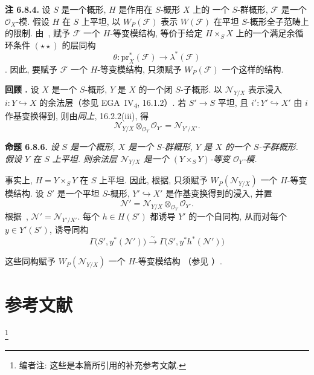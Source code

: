 \medskip
\noindent{}\textbf{注 6.8.4.}
设 \(S\) 是一个概形, \(H\) 是作用在 \(S\)-概形 \(X\) 上的
一个 \(S\)-群概形, \(\mathcal F\) 是一个 \(\mathcal O_X\)-模.
假设 \(H\) 在 \(S\) 上平坦, 以 \(W_P(\mathcal F)\) 表示
\(W(\mathcal F)\) 在平坦 \(S\)-概形全子范畴上的限制.
由~, 赋予
\(\mathcal F\) 一个 \(H\)-等变模结构, 等价于给定
\(H\times_SX\) 上的一个满足余循环条件 \((\star\star)\) 的层同构
\[
  \theta:\mathrm{pr}_X^*(\mathcal F)\longrightarrow\lambda^*(\mathcal F)
\]
. 因此, 要赋予 \(\mathcal F\) 一个 \(H\)-等变模结构,
只须赋予 \(W_P(\mathcal F)\) 一个这样的结构.

\medskip
{}\noindent\textbf{回顾 .}
设 \(X\) 是一个 \(S\)-概形, \(Y\) 是 \(X\) 的一个闭
\(S\)-子概形. 以 \(\mathcal N_{Y/X}\) 表示浸入
\(i:Y\hookrightarrow X\) 的余法层（参见 EGA~IV\textsubscript{4},
16.1.2）. 若 \(S'\to S\) 平坦, 且
\(i':Y'\hookrightarrow X'\) 由 \(i\) 作基变换得到,
则由\emph{同上}, 16.2.2(iii), 得
\[
  \mathcal N_{Y/X}\otimes_{\mathcal O_Y}\mathcal O_{Y'}
  =\mathcal N_{Y'/X'}.
\]

\medskip
\noindent{}\textbf{命题 6.8.6.}
\textit{设 \(S\) 是一个概形, \(X\) 是一个 \(S\)-群概形,
\(Y\) 是 \(X\) 的一个 \(S\)-子群概形. 假设 \(Y\) 在 \(S\)
上平坦. 则余法层 \(\mathcal N_{Y/X}\) 是一个
\((Y\times_SY)\)-等变 \(\mathcal O_Y\)-模.}

事实上, \(H=Y\times_SY\) 在 \(S\) 上平坦.
因此, 根据,
只须赋予 \(W_P(\mathcal N_{Y/X})\) 一个 \(H\)-等变模结构.
设 \(S'\) 是一个平坦 \(S\)-概形, \(Y'\hookrightarrow X'\)
是作基变换得到的浸入, 并置
\[
  \mathcal N'
  =\mathcal N_{Y/X}\otimes_{\mathcal O_Y}\mathcal O_{Y'}.
\]
根据~,
\(\mathcal N'=\mathcal N_{Y'/X'}\).
每个 \(h\in H(S')\) 都诱导 \(Y'\) 的一个自同构,
从而对每个 \(y\in Y'(S')\), 诱导同构
\[
  \Gamma\bigl(S',y^*(\mathcal N')\bigr)
  \xrightarrow{\ \sim\ }
  \Gamma\bigl(S',y^*h^*(\mathcal N')\bigr)
\]

这些同构赋予 \(W_P(\mathcal N_{Y/X})\) 一个 \(H\)-等变模结构
（参见 ）.

\section*{参考文献}
\footnote{编者注: 这些是本篇所引用的补充参考文献.}

